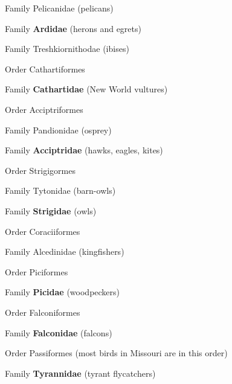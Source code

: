 \documentclass[10pt]{article}
\newlength\mylength
\newcommand*{\growparindent}{\addtolength{\parindent}{\mylength}}
\newcommand*{\reduceparindent}{\addtolength{\parindent}{-1\mylength}}
\begin{document}
\begin{spacing}{1.35}
      	\growparindent
      	
      	Family Pelicanidae (pelicans)
      	
      	Family \textbf{Ardidae} (herons and egrets)
      	
      	Family Treshkiornithodae (ibises)
      	
      \reduceparindent
      
      Order Cathartiformes
      
      	\growparindent
      
      	Family \textbf{Cathartidae} (New World vultures)
      	
      \reduceparindent
      
      Order Acciptriformes
      
      	\growparindent
      	
      	Family Pandionidae (osprey)
      	
      	Family \textbf{Acciptridae} (hawks, eagles, kites)
      	
      \reduceparindent
      
      Order Strigigormes
      
      	\growparindent
      	
      	Family Tytonidae (barn-owls)
      	
      	Family \textbf{Strigidae} (owls)
      	
      \reduceparindent
      
      Order Coraciiformes
      
      	\growparindent
      	
      	Family Alcedinidae (kingfishers)
      	
      \reduceparindent
      
      Order Piciformes
      
      	\growparindent
      	
      	Family \textbf{Picidae} (woodpeckers)
      	
	  \reduceparindent
	  
	  Order Falconiformes
	  
	  	\growparindent
	  	
	  	Family \textbf{Falconidae} (falcons)
	  	
	  \reduceparindent
	  
	  Order Passiformes (most birds in Missouri are in this order)
	  
	  \growparindent
	  
	  	Family \textbf{Tyrannidae} (tyrant flycatchers)
	  	

\end{spacing}
\end{document}
